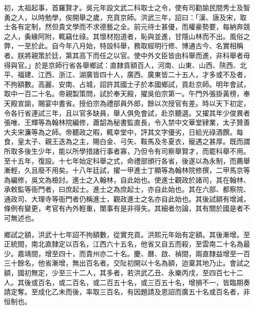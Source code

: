 初，太祖起事，首羅賢才。吳元年設文武二科取士之令，使有司勸諭民間秀士及智勇之人，以時勉學，俟開舉之歲，充貢京師。洪武三年，詔曰：「漢、唐及宋，取士各有定制，然但貴文學而不求德藝之全。前元待士甚優，而權豪勢要，每納奔競之人，夤緣阿附，輒竊仕祿。其懷材抱道者，恥與並進，甘隱山林而不出。風俗之弊，一至於此。自今年八月始，特設科舉，務取經明行修、博通古今、名實相稱者。朕將親策於廷，第其高下而任之以官。使中外文臣皆由科舉而進，非科舉者毋得與官。」於是京師行省各舉鄉試：直隸貢額百人，河南、山東、山西、陝西、北平、福建、江西、浙江、湖廣皆四十人，廣西、廣東皆二十五人，才多或不及者，不拘額數。高麗、安南、占城，詔許其國士子於本國鄉試，貢赴京師。明年會試，取中一百二十名。帝親製策問，試於奉天殿，擢吳伯宗第一。午門外張掛黃榜，奉天殿宣諭，賜宴中書省。授伯宗為禮部員外郎，餘以次授官有差。時以天下初定，令各行省連試三年，且以官多缺員，舉人俱免會試，赴京聽選。又擢其年少俊異者張唯、王輝等為翰林院編修，蕭韶為秘書監直長，令入禁中文華堂肄業，太子贊善大夫宋濂等為之師。帝聽政之暇，輒幸堂中，評其文字優劣，日給光祿酒饌。每食，皇太子、親王迭為之主，賜白金、弓矢、鞍馬及冬夏衣，寵遇之甚厚。既而謂所取多後生少年，能以所學措諸行事者寡，乃但令有司察舉賢才，而罷科舉不用。至十五年，復設。十七年始定科舉之式，命禮部頒行各省，後遂以為永制，而薦舉漸輕，久且廢不用矣。十八年廷試，擢一甲進士丁顯等為翰林院修撰，二甲馬京等為編修，吳文為檢討。進士之入翰林，自此始也。使進士觀政於諸司，其在翰林、承敕監等衙門者，曰庶起士。進士之為庶起士，亦自此始也。其在六部、都察院、通政司、大理寺等衙門者仍稱進士，觀政進士之名亦自此始也。其後試額有增減，條例有變更，考官有內外輕重，闈事有是非得失。其細者勿論，其有關於國是者不可無述也。

鄉試之額，洪武十七年詔不拘額數，從實充貢。洪熙元年始有定額。其後漸增。至正統間，南北直隸定以百名，江西六十五名，他省又自五而殺，至雲南二十名為最少。嘉靖間，增至四十，而貴州亦二十名。慶、曆、啟、禎間，兩直隸益增至一百三十餘名，他省漸增，無出百名者。交阯初開以十名為額，迨棄其地乃止。會試之額，國初無定，少至三十二人，其多者，若洪武乙丑、永樂丙戌，至四百七十二人。其後或百名，或二百名，或二百五十名，或三百五十名，增損不一，皆臨期奏請定奪。至成化乙未而後，率取三百名，有因題請及恩詔而廣五十名或百名者，非恒制也。

